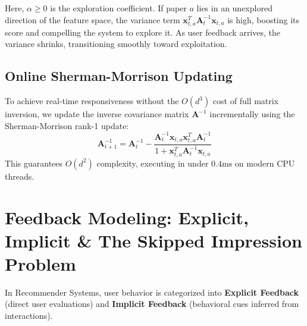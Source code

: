 \documentclass[11pt,a4paper]{article}
\begin{document}
Here, $\alpha \ge 0$ is the exploration coefficient. If paper $a$ lies in an unexplored direction of the feature space, the variance term $\mathbf{x}_{t, a}^T \mathbf{A}_t^{-1} \mathbf{x}_{t, a}$ is high, boosting its score and compelling the system to explore it. As user feedback arrives, the variance shrinks, transitioning smoothly toward exploitation.

\subsection{Online Sherman-Morrison Updating}
To achieve real-time responsiveness without the $O(d^3)$ cost of full matrix inversion, we update the inverse covariance matrix $\mathbf{A}^{-1}$ incrementally using the Sherman-Morrison rank-1 update:
\begin{equation}
\mathbf{A}_{t+1}^{-1} = \mathbf{A}_t^{-1} - \frac{\mathbf{A}_t^{-1} \mathbf{x}_{t, a} \mathbf{x}_{t, a}^T \mathbf{A}_t^{-1}}{1 + \mathbf{x}_{t, a}^T \mathbf{A}_t^{-1} \mathbf{x}_{t, a}}
\end{equation}
This guarantees $O(d^2)$ complexity, executing in under $0.4\text{ms}$ on modern CPU threads.

\section{Feedback Modeling: Explicit, Implicit \& The Skipped Impression Problem}

In Recommender Systems, user behavior is categorized into \textbf{Explicit Feedback} (direct user evaluations) and \textbf{Implicit Feedback} (behavioral cues inferred from interactions).
\end{document}
